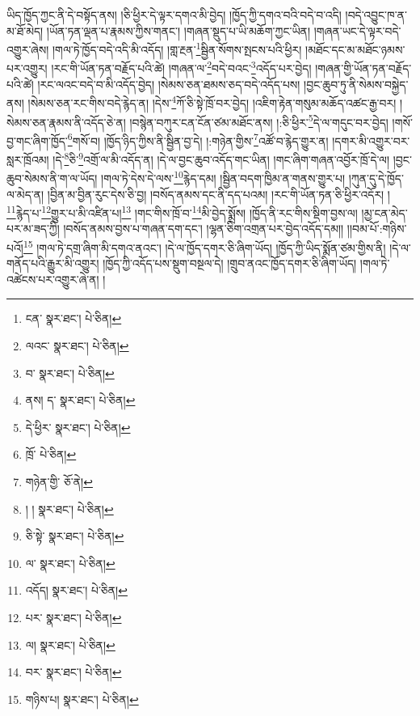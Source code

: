 ཡིད་ཁྱོད་ཀྱང་ནི་དེ་བསྟོད་ནས། །ཅི་ཕྱིར་དེ་ལྟར་དགའ་མི་བྱེད། །ཁྱོད་ཀྱི་དགའ་བའི་བདེ་བ་འདི། །བདེ་འབྱུང་ཁ་ན་མ་ཐོ་མེད། །ཡོན་ཏན་ལྡན་པ་རྣམས་ཀྱིས་གནང་། །གཞན་སྡུད་པ་ཡི་མཆོག་ཀྱང་ཡིན། །གཞན་ཡང་དེ་ལྟར་བདེ་འགྱུར་ཞེས། །གལ་ཏེ་ཁྱོད་བདེ་འདི་མི་འདོད། །གླ་རྔན་\footnote{ངན་  སྣར་ཐང་།  པེ་ཅིན། }སྦྱིན་སོགས་སྤངས་པའི་ཕྱིར། །མཐོང་དང་མ་མཐོང་ཉམས་པར་འགྱུར། །རང་གི་ཡོན་ཏན་བརྗོད་པའི་ཚེ། །གཞན་ལ་\footnote{ལའང་  སྣར་ཐང་།  པེ་ཅིན། }བདེ་བའང་\footnote{བ་  སྣར་ཐང་།  པེ་ཅིན། }འདོད་པར་བྱེད། །གཞན་གྱི་ཡོན་ཏན་བརྗོད་པའི་ཚེ། །རང་ལའང་བདེ་བ་མི་འདོད་བྱེད། །སེམས་ཅན་ཐམས་ཅད་བདེ་འདོད་པས། །བྱང་ཆུབ་ཏུ་ནི་སེམས་བསྐྱེད་ནས། །སེམས་ཅན་རང་གིས་བདེ་རྙེད་ན། །དེས་\footnote{ནས། ད་  སྣར་ཐང་།  པེ་ཅིན། }ཀོ་ཅི་སྟེ་ཁྲོ་བར་བྱེད། །འཇིག་རྟེན་གསུམ་མཆོད་འཚང་རྒྱ་བར། །སེམས་ཅན་རྣམས་ནི་འདོད་ཅེ་ན། །བསྙེན་བཀུར་ངན་ངོན་ཙམ་མཐོང་ནས། །:ཅི་ཕྱིར་\footnote{དེ་ཕྱིར་  སྣར་ཐང་།  པེ་ཅིན། }དེ་ལ་གདུང་བར་བྱེད། །གསོ་བྱ་གང་ཞིག་ཁྱོད་\footnote{ཁྲོ་  པེ་ཅིན། }གསོ་བ། །ཁྱོད་ཉིད་ཀྱིས་ནི་སྦྱིན་བྱ་དེ། །:གཉེན་གྱིས་\footnote{གཉེན་གྱི་  ཅོ་ནེ། }འཚོ་བ་རྙེད་གྱུར་ན། །དགར་མི་འགྱུར་བར་སླར་ཁྲོའམ། །དེ་\footnote{། །  སྣར་ཐང་།  པེ་ཅིན། }ཅི་\footnote{ཅི་སྟེ་  སྣར་ཐང་།  པེ་ཅིན། }འགྲོ་ལ་མི་འདོད་ན། །དེ་ལ་བྱང་ཆུབ་འདོད་གང་ཡིན། །གང་ཞིག་གཞན་འབྱོར་ཁྲོ་དེ་ལ། །བྱང་ཆུབ་སེམས་ནི་ག་ལ་ཡོད། །གལ་ཏེ་དེས་དེ་ལས་\footnote{ལ་  སྣར་ཐང་།  པེ་ཅིན། }རྙེད་དམ། །སྦྱིན་བདག་ཁྱིམ་ན་གནས་གྱུར་པ། །ཀུན་དུ་དེ་ཁྱོད་ལ་མེད་ན། །བྱིན་མ་བྱིན་རུང་དེས་ཅི་བྱ། །བསོད་ནམས་དང་ནི་དད་པའམ། །རང་གི་ཡོན་ཏན་ཅི་ཕྱིར་འདོར། །\footnote{འདོད།   སྣར་ཐང་།  པེ་ཅིན། }རྙེད་པ་\footnote{པར་  སྣར་ཐང་།  པེ་ཅིན། }གྱུར་པ་མི་འཛིན་པ།\footnote{ལ།  སྣར་ཐང་།  པེ་ཅིན། } །གང་གིས་ཁྲོ་བ་\footnote{བར་  སྣར་ཐང་།  པེ་ཅིན། }མི་བྱེད་སྨྲོས། །ཁྱོད་ནི་རང་གིས་སྡིག་བྱས་ལ། །མྱ་ངན་མེད་པར་མ་ཟད་ཀྱི། །བསོད་ནམས་བྱས་པ་གཞན་དག་དང་། །ལྷན་ཅིག་འགྲན་པར་བྱེད་འདོད་དམ།། །།བམ་པོ་:གཉིས་པའོ།\footnote{གཉིས་པ།  སྣར་ཐང་།  པེ་ཅིན། } །གལ་ཏེ་དགྲ་ཞིག་མི་དགའ་ནའང་། །དེ་ལ་ཁྱོད་དགར་ཅི་ཞིག་ཡོད། །ཁྱོད་ཀྱི་ཡིད་སྨོན་ཙམ་གྱིས་ནི། །དེ་ལ་གནོད་པའི་རྒྱུར་མི་འགྱུར། །ཁྱོད་ཀྱི་འདོད་པས་སྡུག་བསྔལ་དེ། །གྲུབ་ནའང་ཁྱོད་དགར་ཅི་ཞིག་ཡོད། །གལ་ཏེ་འཚེངས་པར་འགྱུར་ཞེ་ན། །
